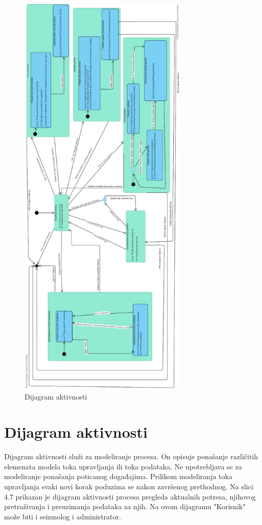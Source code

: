 		\begin{figure}[H]
            \includegraphics[width=\textwidth, height=20cm]{slike/dijagramstanja.png}
            \caption{Dijagram aktivnosti}
            \label{fig:uml_db} 
        \end{figure}
			
			\eject 
		
		\section{Dijagram aktivnosti}
		
		Dijagram aktivnosti služi za modeliranje procesa. On opisuje ponašanje različitih elemenata modela toka upravljanja ili toka podataka. Ne upotrebljava se za modeliranje ponašanja poticanog događajima. Prilikom modeliranja toka upravljanja svaki novi korak poduzima se nakon završenog
		prethodnog. Na slici 4.7 prikazan je dijagram aktivnosti procesa pregleda aktualnih potresa, njihovog pretraživanja i preuzimanja podataka za njih. 
		Na ovom dijagramu "Korisnik" može biti i seizmolog i administrator.
		
